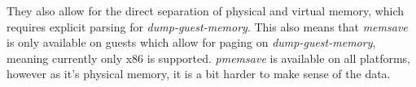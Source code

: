 They also allow for the direct separation of physical and virtual memory,
which requires explicit parsing for \emph{dump-guest-memory}.
This also means that \emph{memsave} is only available on guests which allow for paging on \emph{dump-guest-memory},
meaning currently only x86 is supported.
\emph{pmemsave} is available on all platforms, however as it's physical memory,
it is a bit harder to make sense of the data.